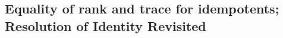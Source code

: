 \documentclass{article}
\theoremstyle{definition}
\begin{document}
\subsection{Equality of rank and trace for idempotents; Resolution of Identity Revisited}
\end{document}
